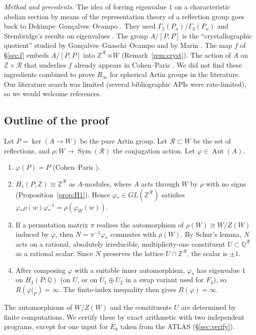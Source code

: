 \documentclass[11pt]{amsart}
\theoremstyle{definition}
\newcommand{\Z}{\mathbb{Z}}
\newcommand{\Q}{\mathbb{Q}}
\newcommand{\R}{\mathcal{R}}
\newcommand{\Aut}{\operatorname{Aut}}
\newcommand{\Sym}{\operatorname{Sym}}
\newcommand{\Rinf}{R_\infty}
\begin{document}
\smallskip\noindent\emph{Method and precedents.} The idea of forcing eigenvalue $1$ on a characteristic abelian
section by means of the representation theory of a reflection group goes back to Dekimpe--Gon\c{c}alves--Ocampo
\cite{DGO21}. They used $\Gamma_2(P_n)/\Gamma_3(P_n)$ and Stembridge's results on eigenvalues \cite{Ste89}. The
group $A/[P,P]$ is the ``crystallographic quotient'' studied by Gon\c{c}alves--Guaschi--Ocampo \cite{GGO17} and by
Marin \cite{Mar15}. The map $f$ of \S\ref{sec:f} embeds $A/[P,P]$ into $\Z^\R\rtimes W$
(Remark~\ref{rem:cryst}). The action of $A$ on $\Z\times\R$ that underlies $f$ already appears in
Cohen--Paris \cite[Lemma~3.7]{CP03}. We did not find these ingredients combined to prove $\Rinf$ for spherical
Artin groups in the literature. Our literature search was limited (several bibliographic APIs were rate-limited),
so we would welcome references.

\subsection{Outline of the proof}
Let $P=\ker(A\to W)$ be the pure Artin group. Let $\R\subset W$ be the set of reflections, and
$\rho\colon W\to\Sym(\R)$ the conjugation action. Let $\varphi\in\Aut(A)$.
\begin{enumerate}[label=(\arabic*)]
\item $\varphi(P)=P$ (Cohen--Paris \cite{CP03}).
\item $H_1(P;\Z)\cong\Z^\R$ as $A$-modules, where $A$ acts through $W$ by $\rho$ with no signs
(Proposition~\ref{prop:H1}). Hence $\varphi_*\in GL(\Z^\R)$ satisfies
$\varphi_*\rho(w)\varphi_*^{-1}=\rho(\varphi_W(w))$.
\item If a permutation matrix $\pi$ realises the automorphism of $\rho(W)\cong W/Z(W)$ induced by $\varphi$,
then $N=\pi^{-1}\varphi_*$ commutes with $\rho(W)$. By Schur's lemma, $N$ acts on a rational, absolutely
irreducible, multiplicity-one constituent $U\subset\Q^\R$ as a rational scalar. Since $N$ preserves the lattice
$U\cap\Z^\R$, the scalar is $\pm1$.
\item After composing $\varphi$ with a suitable inner automorphism, $\varphi_*$ has eigenvalue $1$ on
$H_1(P;\Q)$ (on $U$, or on $U_1\oplus U_2$ in a swap variant used for $F_4$), so
$R(\varphi|_P)=\infty$. The finite-index inequality then gives $R(\varphi)=\infty$.
\end{enumerate}
The automorphisms of $W/Z(W)$ and the constituents $U$ are determined by finite computations. We certify these
by exact arithmetic with two independent programs, except for one input for $E_8$ taken from the ATLAS
(\S\ref{sec:verify}).
\end{document}
